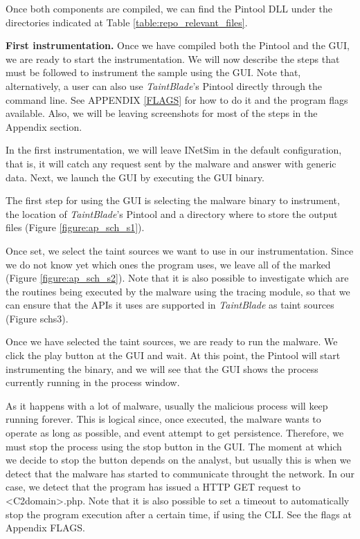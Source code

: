 \documentclass[conference]{IEEEtran}
\begin{document}
Once both components are compiled, we can find the Pintool DLL under the directories indicated at Table \ref{table:repo_relevant_files}.

\textbf{First instrumentation.}
Once we have compiled both the Pintool and the GUI, we are ready to start the instrumentation. We will
now describe the steps that must be followed to instrument the sample using the GUI. Note that, alternatively,
a user can also use \textit{TaintBlade}'s Pintool directly through the command line. See APPENDIX \ref{FLAGS} for
how to do it and the program flags available. Also, we will be leaving screenshots for most of the steps in 
the Appendix section.

In the first instrumentation, we will leave INetSim in the default configuration, that is, it will catch
any request sent by the malware and answer with generic data. Next, we launch the GUI by executing the GUI binary.

The first step for using the GUI is selecting the malware binary to instrument, the location of \textit{TaintBlade}'s
Pintool and a directory where to store the output files (Figure \ref{figure:ap_sch_s1}).

Once set, we select the taint sources we want to use in our instrumentation. Since we do not know yet
which ones the program uses, we leave all of the marked (Figure \ref{figure:ap_sch_s2}). Note that it
is also possible to investigate which are the routines being executed by the malware using the tracing module,
so that we can ensure that the APIs it uses are supported in \textit{TaintBlade} as taint sources (Figure
schs3).

Once we have selected the taint sources, we are ready to run the malware. We click the play button at the GUI
and wait. At this point, the Pintool will start instrumenting the binary, and we will see that the GUI
shows the process currently running in the process window. 

As it happens with a lot of malware, usually the malicious process will keep running forever. This is logical
since, once executed, the malware wants to operate as long as possible, and event attempt to get persistence.
Therefore, we must stop the process using the stop button in the GUI. The moment at which we decide to stop
the button depends on the analyst, but usually this is when we detect that the malware has started to communicate
throught the network. In our case, we detect that the program has issued a HTTP GET request to \textless C2domain\textgreater.php.
Note that it is also possible to set a timeout to automatically stop the program execution after
a certain time, if using the CLI. See the flags at Appendix {FLAGS}.
\end{document}
